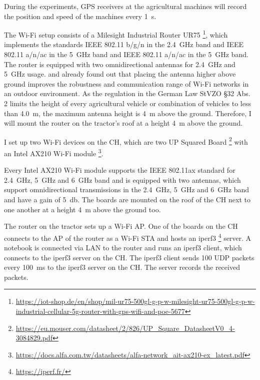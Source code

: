 During the experiments, \ac{GPS} receivers at the agricultural machines will record the position and speed of the machines every \SI{1}{\second}.

The Wi-Fi setup consists of a Milesight Industrial Router UR75 \footnote{\url{https://iot-shop.de/en/shop/mil-ur75-500gl-g-p-w-milesight-ur75-500gl-g-p-w-industrial-cellular-5g-router-with-gps-wifi-and-poe-5677}}, which implements the standards IEEE 802.11 b/g/n in the \SI{2.4}{\giga\hertz} band and IEEE 802.11 a/n/ac in the \SI{5}{\giga\hertz} band and
IEEE 802.11 a/n/ac in the \SI{5}{\giga\hertz} band.
The router is equipped with two omnidirectional antennas for  \SI{2.4}{\giga\hertz} and \SI{5}{\giga\hertz} usage.
\textcite{brinkhoff_characterization_2017} and \textcite{paul_characterizing_2011}  already found out that placing the antenna higher above ground improves
the robustness and communication range of Wi-Fi networks in an outdoor environment.
As the regulation in the German Law StVZO §32 Abs. 2 limits the height of
every agricultural vehicle or combination of vehicles to less than \SI{4.0}{\metre}, the maximum antenna height is \SI{4}{\metre} above the ground. Therefore, I will mount the router on the tractor's roof at a height \SI{4}{\metre} above the ground.

I set up two Wi-Fi devices on the \ac{CH}, which are two UP Squared Board \footnote{\url{https://eu.mouser.com/datasheet/2/826/UP_Square_DatasheetV0_4-3084829.pdf}} with an Intel AX210 Wi-Fi module \footnote{\url{https://docs.alfa.com.tw/datasheets/alfa-network_ait-ax210-ex_latest.pdf}}.

Every Intel AX210 Wi-Fi module supports the IEEE 802.11ax standard for \SI{2.4}{\giga\hertz}, \SI{5}{\giga\hertz} and \SI{6}{\giga\hertz} band and is equipped with two antennas,
which support omnidirectional transmissions in the \SI{2.4}{\giga\hertz}, \SI{5}{\giga\hertz} and \SI{6}{\giga\hertz} band and have a gain of \SI{5}{\decibel}.
The boards are mounted on the roof of the \ac{CH} next to one another at a height \SI{4}{\metre} above the ground too.

The router on the tractor sets up a Wi-Fi \ac{AP}.
One of the boards on the \ac{CH} connects to the \ac{AP} of the router as a Wi-Fi \ac{STA} and hosts an iperf3 \footnote{\url{https://iperf.fr/}} server.
A notebook is connected via LAN to the router and runs an iperf3 client, which connects to the iperf3 server on the \ac{CH}.
The iperf3 client sends \SI{100}{\byte} UDP packets every \SI{100}{\milli\second} to the iperf3 server on the \ac{CH}.
The server records the received packets.

